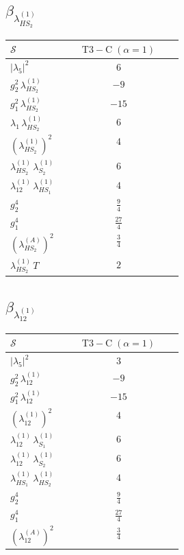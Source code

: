 \documentclass[9pt]{article}
\begin{document}
\subsection*{$ \beta_{\lambda_{HS_2}^{(1)}} $}
\begin{longtable}{@{}p{0.31\linewidth}c@{}}
\toprule
$\mathcal{S}$ & $ \mathrm{T3-C}\;(\alpha=1) $ \\
\midrule
$ |\lambda_5|^2 $ & $ 6 $ \\
$ g_2^2\,\lambda_{HS_2}^{(1)} $ & $ -9 $ \\
$ g_1^2\,\lambda_{HS_2}^{(1)} $ & $ -15 $ \\
$ \lambda_1\,\lambda_{HS_2}^{(1)} $ & $ 6 $ \\
$ \left(\lambda_{HS_2}^{(1)}\right)^2 $ & $ 4 $ \\
$ \lambda_{HS_2}^{(1)}\,\lambda_{S_2}^{(1)} $ & $ 6 $ \\
$ \lambda_{12}^{(1)}\,\lambda_{HS_1}^{(1)} $ & $ 4 $ \\
$ g_2^4 $ & $ \frac{9}{4} $ \\
$ g_1^4 $ & $ \frac{27}{4} $ \\
$ \left(\lambda_{HS_2}^{(A)}\right)^2 $ & $ \frac{3}{4} $ \\
$ \lambda_{HS_2}^{(1)}\,T $ & $ 2 $ \\
\bottomrule
\end{longtable}
\subsection*{$ \beta_{\lambda_{12}^{(1)}} $}
\begin{longtable}{@{}p{0.31\linewidth}c@{}}
\toprule
$\mathcal{S}$ & $ \mathrm{T3-C}\;(\alpha=1) $ \\
\midrule
$ |\lambda_5|^2 $ & $ 3 $ \\
$ g_2^2\,\lambda_{12}^{(1)} $ & $ -9 $ \\
$ g_1^2\,\lambda_{12}^{(1)} $ & $ -15 $ \\
$ \left(\lambda_{12}^{(1)}\right)^2 $ & $ 4 $ \\
$ \lambda_{12}^{(1)}\,\lambda_{S_1}^{(1)} $ & $ 6 $ \\
$ \lambda_{12}^{(1)}\,\lambda_{S_2}^{(1)} $ & $ 6 $ \\
$ \lambda_{HS_1}^{(1)}\,\lambda_{HS_2}^{(1)} $ & $ 4 $ \\
$ g_2^4 $ & $ \frac{9}{4} $ \\
$ g_1^4 $ & $ \frac{27}{4} $ \\
$ \left(\lambda_{12}^{(A)}\right)^2 $ & $ \frac{3}{4} $ \\
\bottomrule
\end{longtable}
\end{document}
